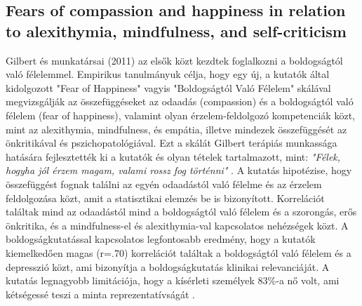\subsection{Fears of compassion and happiness in relation
	to alexithymia, mindfulness, and self-criticism \cite{gilbert_mcewan_gibbons_chotai_duarte_matos_2011}}
Gilbert és munkatársai (2011) az elsők közt kezdtek foglalkozni a boldogságtól való félelemmel. Empirikus tanulmányuk célja, hogy egy új, a kutatók által kidolgozott "Fear of Happiness" vagyis "Boldogságtól Való Félelem" skálával \cite{gilbert_mcewan_gibbons_chotai_duarte_matos_2011} megvizsgálják az összefüggéseket az odaadás (compassion) és a boldogságtól való félelem (fear of happiness), valamint olyan érzelem-feldolgozó kompetenciák közt, mint az  alexithymia, mindfulness, és empátia, illetve mindezek összefüggését az önkritikával és pszichopatológiával. Ezt a skálát Gilbert terápiás munkassága hatására fejlesztették ki a kutatók és olyan tételek tartalmazott, mint: \textit{"Félek, hogyha jól érzem magam, valami rossz fog történni"} \cite[o. 381]{gilbert_mcewan_gibbons_chotai_duarte_matos_2011}. A kutatás hipotézise, hogy összefüggést fognak találni az egyén odaadástól való félelme és az érzelem feldolgozása közt, amit a statisztikai elemzés be is bizonyított. Korrelációt találtak mind az odaadástól mind a boldogságtól való félelem és a szorongás, erős önkritika, és a mindfulness-el és alexithymia-val kapcsolatos nehézségek közt. A boldogságkutatással kapcsolatos legfontosabb eredmény, hogy a kutatók kiemelkedően magas (r=.70) korrelációt találtak a boldogságtól való félelem és a depresszió közt, ami bizonyítja a boldogságkutatás klinikai relevanciáját. A kutatás legnagyobb limitációja, hogy a kísérleti személyek 83\%-a nő volt, ami kétségessé teszi a minta reprezentatívságát \cite{gilbert_mcewan_gibbons_chotai_duarte_matos_2011}.

